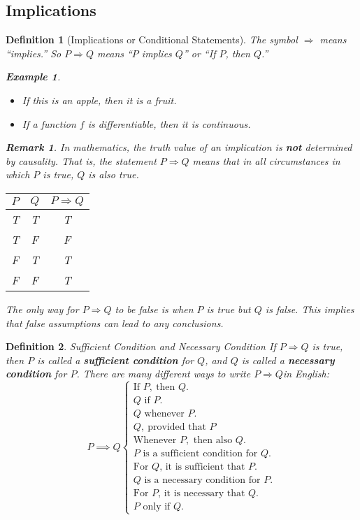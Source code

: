 \documentclass[12pt,a4paper]{article}
\newtheorem{df}{Definition}[subsection]
\newtheorem{eg}{Example}[subsection]
\newtheorem*{rmk}{\indent Remark}
\def\Q{{\mathbb{Q}}}
\begin{document}
\subsection{Implications}
\begin{df}[Implications or Conditional Statements]
	The symbol $\Rightarrow$ means ``implies.'' So $P\Rightarrow Q$ means ``$P$ implies $Q$'' or ``If $P$, then $Q$.''
	\begin{eg}
		\begin{itemize}
			\item If this is an apple, then it is a fruit.
			\item If a function $f$ is differentiable, then it is continuous.
		\end{itemize}	
	\end{eg}
	\begin{rmk}
		In mathematics, the truth value of an implication is \textbf{not} determined by causality. That is, the statement $P\Rightarrow Q$ means that in all circumstances in which $P$ is true, $Q$ is also true.
		\begin{center}\begin{tabular}{c|c|c}
			$P$&$Q$&$P\Rightarrow Q$\\
			\hline
			T&T&T\\
			T&F&F\\
			F&T&T\\
			F&F&T
		\end{tabular}\end{center}
		The only way for $P\Rightarrow Q$ to be false is when $P$ is true but $Q$ is false. This implies that false assumptions can lead to any conclusions. 
	\end{rmk}
\end{df}
\begin{df}{Sufficient Condition and Necessary Condition}
	If $P\Rightarrow Q$ is true, then $P$ is called a \textbf{sufficient condition} for $Q$, and $Q$ is called a \textbf{necessary condition} for $P$. There are many different ways to write $P\Rightarrow Q$in English: 
	\[P\implies Q\begin{cases}\text{If }P,\ \text{then }Q.\\Q\text{ if }P.\\Q\text{ whenever }P.\\Q,\ \text{provided that }P\\\text{Whenever }P,\text{ then also }Q.\\P\text{ is a sufficient condition for }Q.\\\text{For }Q\text{, it is sufficient that }P.\\Q\text{ is a necessary condition for }P.\\\text{For }P\text{, it is necessary that }Q.\\P\text{ only if }Q.\end{cases}\]	
\end{df}
\end{document}
